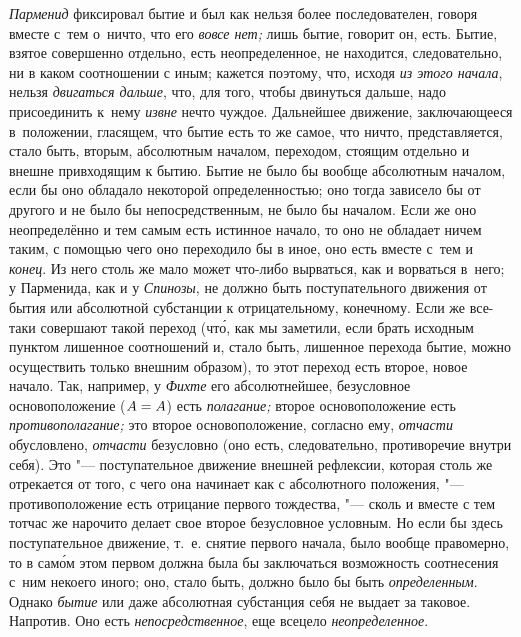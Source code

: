 {\em Парменид} фиксировал бытие и был как нельзя более последователен, говоря
вместе с~тем о~ничто, что его {\em вовсе нет;} лишь бытие, говорит он, есть.
Бытие, взятое совершенно отдельно, есть неопределенное, не находится,
следовательно, ни в каком соотношении с иным; кажется поэтому, что, исходя
{\em из этого начала}, нельзя {\em двигаться дальше}, что, для того,
чтобы двинуться дальше, надо присоединить к~нему {\em извне} нечто чуждое.
Дальнейшее движение, заключающееся в~положении, гласящем, что бытие есть то же
самое, что ничто, представляется, стало быть, вторым, абсолютным началом,
переходом, стоящим отдельно и внешне привходящим к бытию. Бытие не было бы
вообще абсолютным началом, если бы оно обладало некоторой определенностью; оно
тогда зависело бы от другого и не было бы непосредственным, не было бы началом.
Если же оно неопределённо и тем самым есть истинное начало, то оно не обладает
ничем таким, с помощью чего оно переходило бы в иное, оно есть вместе с~тем и
{\em конец}. Из него столь же мало может что-либо вырваться, как и ворваться
в~него; у Парменида, как и у {\em Спинозы}, не должно быть поступательного
движения от бытия или абсолютной субстанции к отрицательному, конечному. Если
же все-таки совершают такой переход (чт\'{о}, как мы заметили, если брать
исходным пунктом лишенное соотношений и, стало быть, лишенное перехода бытие,
можно осуществить только внешним образом), то этот переход есть второе, новое
начало. Так, например, у {\em Фихте} его абсолютнейшее, безусловное
основоположение ($A\hm=A$) есть {\em полагание;} второе основоположение есть
{\em противополагание;} это второе основоположение, согласно ему, {\em отчасти}
обусловлено, {\em отчасти} безусловно (оно есть, следовательно, противоречие
внутри себя). Это "--- поступательное движение внешней рефлексии, которая столь
же отрекается от того, с чего она начинает как с абсолютного положения, "---
противоположение есть отрицание первого тождества, "--- сколь и вместе с тем
тотчас же нарочито делает свое второе безусловное условным. Но если бы здесь
поступательное движение, т.~е. снятие первого начала, было вообще правомерно,
то в сам\'{о}м этом первом должна была бы заключаться возможность соотнесения
с~ним некоего иного; оно, стало быть, должно было бы быть {\em определенным}.
Однако {\em бытие} или даже абсолютная субстанция себя не выдает за таковое.
Напротив. Оно есть {\em непосредственное}, еще всецело {\em неопределенное}.

